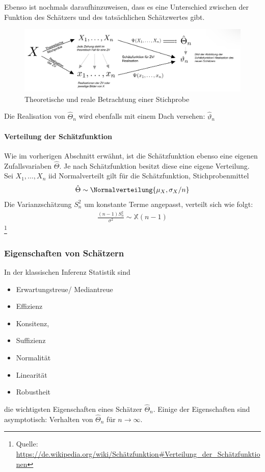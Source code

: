 Ebenso ist nochmals daraufhinzuweisen, dass es eine Unterschied zwischen der Funktion des Schätzers und des tatsächlichen Schätzwertes gibt.

\begin{figure}[H]
	\centering
	\includegraphics[width=0.7\linewidth]{attachment/chapter_13/Scc072}
	\caption{Theoretische und reale Betrachtung einer Stichprobe}
\end{figure}

Die Realisation von $\hat{\Theta}_n$ wird ebenfalls mit einem Dach versehen: $\hat{\vartheta}_n$

\paragraph{Verteilung der Schätzfunktion}
Wie im vorherigen Abschnitt erwähnt, ist die Schätzfunktion ebenso eine eigenen Zufallsvariaben $\hat{\Theta}$. Je nach Schätzfunktion besitzt diese eine eigene Verteilung. \\

Sei $X_1,\dots, X_n$ \gls{iid} Normalverteilt gilt für die Schätzfunktion, Stichprobenmittel
\begin{align}
	\hat{\Theta}\sim \Normalverteilung{\mu_X, \sigma_X/n}
\end{align}
Die Varianzschätzung $S_n^2$ um konstante Terme angepasst, verteilt sich wie folgt:
\begin{align}
	\frac{(n-1)S_n^2}{\sigma^2}\sim \mathbb{X}(n-1)
\end{align}
\footnote{Quelle: \href{Schätzfunktion, Wiki}{https://de.wikipedia.org/wiki/Schätzfunktion#Verteilung_der_Schätzfunktionen}}
\subsubsection{Eigenschaften von Schätzern}
In der klassischen Inferenz Statistik sind
\begin{itemize}
	\item Erwartungstreue/ Mediantreue
	\item Effizienz
	\item Konsitenz,
	\item Suffizienz
	\item Normalität
	\item Linearität
	\item Robustheit
\end{itemize}
die wichtigsten Eigenschaften eines Schätzer $\hat{\Theta}_n$. Einige der Eigenschaften sind asymptotisch: Verhalten von $\hat{\Theta}_n$ für $n\rightarrow \infty$.

